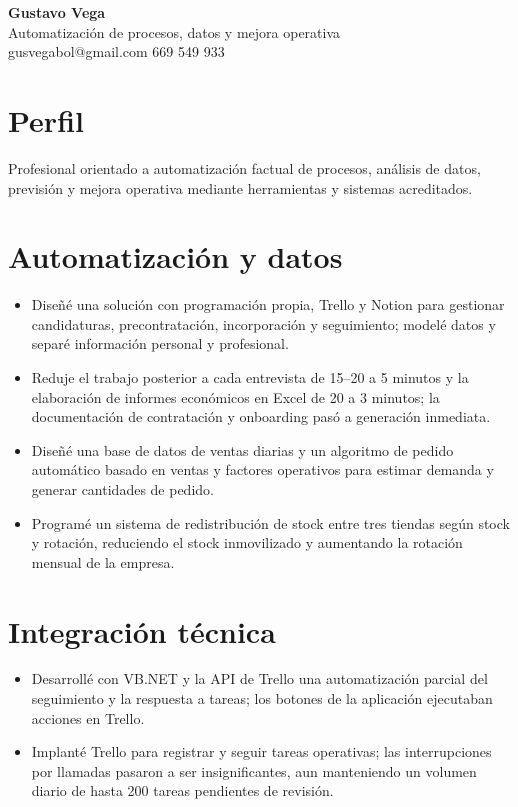 \documentclass[11pt,a4paper]{article}
\begin{document}
{\color{primary}\LARGE\textbf{Gustavo Vega}}\\
{\color{secondary}\large Automatización de procesos, datos y mejora operativa}\\
gusvegabol@gmail.com \textbar{} 669 549 933

\section*{Perfil}
Profesional orientado a automatización factual de procesos, análisis de datos, previsión y mejora operativa mediante herramientas y sistemas acreditados.

\section*{Automatización y datos}
\begin{itemize}[leftmargin=*,nosep]
\item Diseñé una solución con programación propia, Trello y Notion para gestionar candidaturas, precontratación, incorporación y seguimiento; modelé datos y separé información personal y profesional.
\item Reduje el trabajo posterior a cada entrevista de 15–20 a 5 minutos y la elaboración de informes económicos en Excel de 20 a 3 minutos; la documentación de contratación y onboarding pasó a generación inmediata.
\item Diseñé una base de datos de ventas diarias y un algoritmo de pedido automático basado en ventas y factores operativos para estimar demanda y generar cantidades de pedido.
\item Programé un sistema de redistribución de stock entre tres tiendas según stock y rotación, reduciendo el stock inmovilizado y aumentando la rotación mensual de la empresa.
\end{itemize}

\section*{Integración técnica}
\begin{itemize}[leftmargin=*,nosep]
\item Desarrollé con VB.NET y la API de Trello una automatización parcial del seguimiento y la respuesta a tareas; los botones de la aplicación ejecutaban acciones en Trello.
\item Implanté Trello para registrar y seguir tareas operativas; las interrupciones por llamadas pasaron a ser insignificantes, aun manteniendo un volumen diario de hasta 200 tareas pendientes de revisión.
\end{itemize}
\end{document}
